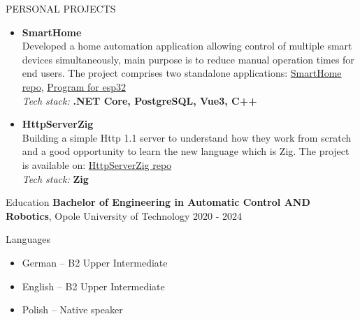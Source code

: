 \documentclass{resume}
\begin{document}
\begin{rSection}{PERSONAL PROJECTS}
\begin{itemize}[leftmargin=0.5cm]
\item \textbf{SmartHome} \\ [0.4em]
Developed a home automation application allowing control of multiple smart devices simultaneously, main purpose is to reduce manual operation times for end users.
           The project comprises two standalone applications: \href{https://github.com/RoobyJ/SmartHome}{SmartHome repo}, \href{https://github.com/RoobyJ/GarageController}{Program for esp32}\\ [0.4em]
           \textit{Tech stack:} \textbf{.NET Core, PostgreSQL, Vue3, C++}
\item \textbf{HttpServerZig} \\ [0.4em]
           Building a simple Http 1.1 server to understand how they work from scratch and a good opportunity to learn the new language which is Zig. 
           The project is available on: \href{https://github.com/RoobyJ/HttpServerZig}{HttpServerZig repo}\\ [0.4em]
           \textit{Tech stack:} \textbf{Zig}
\end{itemize}
\item \end{rSection}

\begin{rSection}{Education}
{\bf Bachelor of Engineering in Automatic Control AND Robotics}, Opole University of Technology \hfill {2020 - 2024} \\
\end{rSection}

\begin{rSection}{Languages}
\begin{multicols}{2}
\begin{itemize}[leftmargin=0.5cm]
        \item German – B2 Upper Intermediate
        \item English – B2 Upper Intermediate
        \item Polish – Native speaker
    \end{itemize}
\end{multicols}
\end{rSection}
\end{document}
